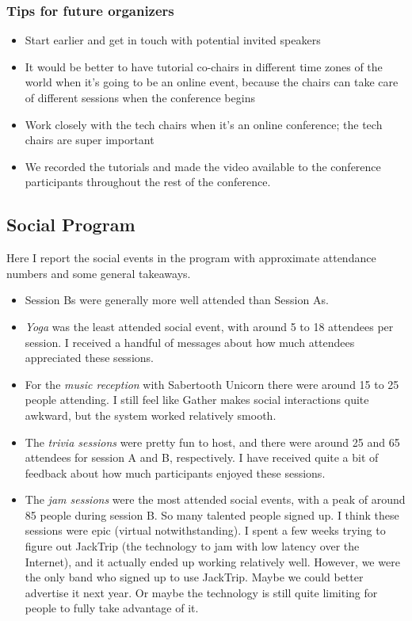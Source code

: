\documentclass[%
10pt,								%
]
{scrartcl}
\begin{document}
        \subsubsection{Tips for future organizers}
            \begin{itemize}
                \item Start earlier and get in touch with potential invited speakers

                \item   It would be better to have tutorial co-chairs in different time zones of the world when it’s going to be an online event, because the chairs can take care of different sessions when the conference begins

                \item  Work closely with the tech chairs when it’s an online conference; the tech chairs are super important

                \item  We recorded the tutorials and made the video available to the conference participants throughout the rest of the conference.
            \end{itemize}
    
    \subsection{Social Program}
        Here I report the social events in the program with approximate attendance numbers and some general takeaways.

        \begin{itemize}
            \item Session Bs were generally more well attended than Session As.
            \item   \textit{Yoga} was the least attended social event, with around 5 to 18 attendees per session. I received a handful of messages about how much attendees appreciated these sessions.
            \item   For the \textit{music reception} with Sabertooth Unicorn there were around 15 to 25 people attending. I still feel like Gather makes social interactions quite awkward, but the system worked relatively smooth.
            \item   The \textit{trivia sessions} were pretty fun to host, and there were around 25 and 65 attendees for session A and B, respectively. I have received quite a bit of feedback about how much participants enjoyed these sessions.
            \item   The \textit{jam sessions} were the most attended social events, with a peak of around 85 people during session B. So many talented people signed up. I think these sessions were epic (virtual notwithstanding). I spent a few weeks trying to figure out JackTrip (the technology to jam with low latency over the Internet), and it actually ended up working relatively well. However, we were the only band who signed up to use JackTrip. Maybe we could better advertise it next year. Or maybe the technology is still quite limiting for people to fully take advantage of it.
        \end{itemize}
 
\end{document}
